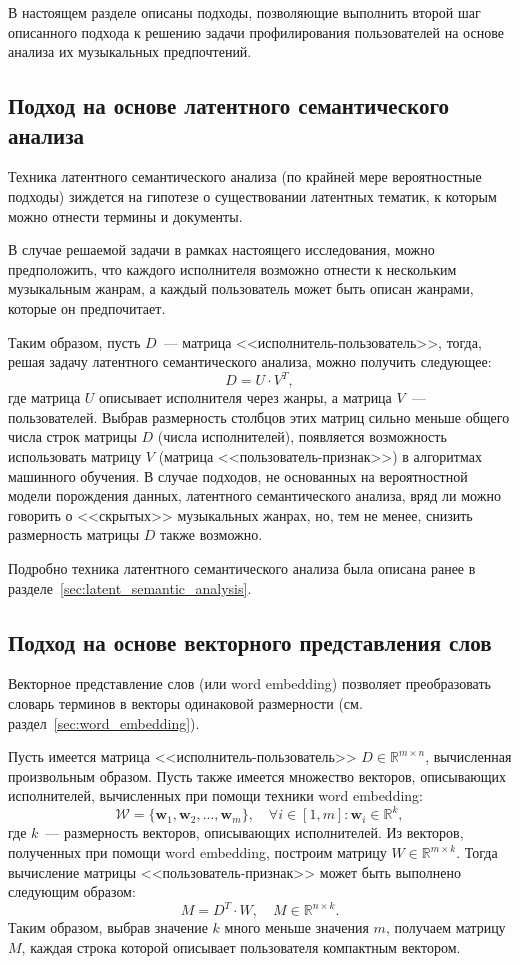 В настоящем разделе описаны подходы, позволяющие выполнить
второй шаг описанного подхода к решению задачи профилирования
пользователей на основе анализа их музыкальных предпочтений.

\subsection{Подход на основе латентного семантического анализа}

Техника латентного семантического анализа (по крайней мере
вероятностные подходы) зиждется на гипотезе о существовании
латентных тематик, к которым можно отнести термины и документы.

В случае решаемой задачи в рамках настоящего исследования,
можно предположить, что каждого исполнителя возможно отнести
к нескольким музыкальным жанрам, а каждый пользователь может быть
описан жанрами, которые он предпочитает.

Таким образом, пусть $D$~--- матрица <<исполнитель-пользователь>>,
тогда, решая задачу латентного семантического анализа, можно
получить следующее:
\[
    D = U \cdot V^T,
\]
где матрица $U$ описывает исполнителя через жанры, а матрица
$V$~--- пользователей. Выбрав размерность столбцов этих
матриц сильно меньше общего числа строк матрицы $D$ (числа
исполнителей), появляется возможность использовать матрицу $V$
(матрица <<пользователь-признак>>) в алгоритмах машинного обучения.  
В случае подходов, не основанных на вероятностной модели порождения
данных, латентного семантического анализа, вряд ли можно говорить о
<<скрытых>> музыкальных жанрах, но, тем не менее, снизить размерность
матрицы $D$ также возможно.

Подробно техника латентного семантического анализа была описана
ранее в разделе~\ref{sec:latent_semantic_analysis}.

\subsection{Подход на основе векторного представления слов}

Векторное представление слов (или word embedding) позволяет
преобразовать словарь терминов в векторы одинаковой размерности
(см. раздел~\ref{sec:word_embedding}). 

Пусть имеется матрица <<исполнитель-пользователь>>
$D \in \mathbb{R}^{m \times n}$, вычисленная произвольным
образом. Пусть также имеется множество векторов,
описывающих исполнителей, вычисленных при помощи техники
word embedding: 
\[
    \mathcal{W} = \{\bm{w}_1, \bm{w}_2,..., \bm{w}_m\},\quad
    \forall i \in [1, m] \colon \bm{w}_i \in \mathbb{R}^k,
\]
где $k$~--- размерность векторов, описывающих исполнителей.
Из векторов, полученных при помощи word embedding, построим
матрицу $W \in \mathbb{R}^{m \times k}$. Тогда вычисление матрицы
<<пользователь-признак>> может быть выполнено следующим образом:
\[
    M = D^T \cdot W,\quad M \in \mathbb{R}^{n \times k}.
\]
Таким образом, выбрав значение $k$ много меньше значения $m$,
получаем матрицу $M$, каждая строка которой описывает
пользователя компактным вектором.

